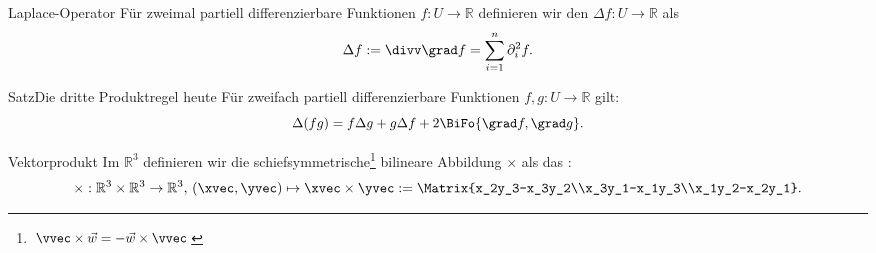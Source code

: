 \begin{Def}
{Laplace-Operator}
Für zweimal partiell differenzierbare Funktionen $f:U\to\mathbb{R}$ definieren wir den  $\Delta f:U\to \mathbb{R}$ als
\begin{equation*}
    \Delta f:=\divv \grad f=\sum_{i=1}^n\partial_i^2f.
\end{equation*}
\end{Def}
\begin{Satz}
{Satz}{Die dritte Produktregel heute}
Für zweifach partiell differenzierbare Funktionen $f,g:U\to\mathbb{R}$ gilt:
\begin{equation*}
    \Delta (f g)=f\Delta g+g\Delta f+2\BiFo{\grad f,\grad g}.
\end{equation*}
\end{Satz}
\begin{Def}
{Vektorprodukt}
Im $\mathbb{R}^3$ definieren wir die schiefsymmetrische\footnote{$\vvec\times\Vec{w}=-\Vec{w}\times \vvec$} bilineare Abbildung $\times$ als das :
\begin{equation*}
    \times:\mathbb{R}^3\times \mathbb{R}^3\to\mathbb{R}^3,\,(\xvec,\yvec)\mapsto \xvec\times\yvec:=\Matrix{x_2y_3-x_3y_2\\x_3y_1-x_1y_3\\x_1y_2-x_2y_1}.
\end{equation*}
\end{Def}
